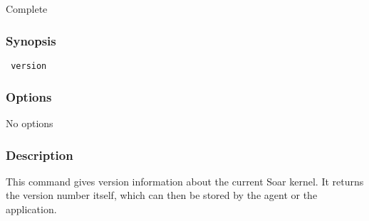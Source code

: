\subsection{}
\label{version}
 Complete
\subsubsection*{Synopsis}
\begin{verbatim}
 version
\end{verbatim}
\subsubsection*{Options}
 No options 
\subsubsection*{Description}
 This command gives version information about the current Soar kernel. It returns the version number itself, which can then be stored by the agent or the application. 
